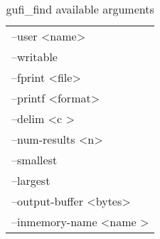 \begin{table} [h]
\begin{tabular}{l}
--user \textless name\textgreater\\
--writable\\
--fprint \textless file\textgreater\\
--printf \textless format\textgreater\\
--delim \textless c \textgreater\\
--num-results \textless n\textgreater\\
--smallest\\
--largest\\
--output-buffer \textless bytes\textgreater\\
--inmemory-name \textless name \textgreater
\end{tabular}
\caption{\label{fig:gufi_find_arguments}gufi\_find available arguments}
\end{table}